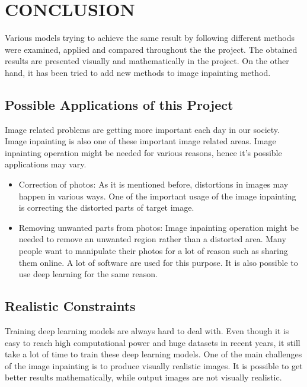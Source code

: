 \chapter{CONCLUSION}\label{conclution}

Various models trying to achieve the same result by following different methods were examined, applied and compared throughout the the project. The obtained results are presented visually and mathematically in the project. On the other hand, it has been tried to add new methods to image inpainting method.

\section{Possible Applications of this Project}

Image related problems are getting more important each day in our society. Image inpainting is also one of these important image related areas. Image inpainting operation might be needed for various reasons, hence it's possible applications may vary.

\begin{itemize}
  \item Correction of photos: As it is mentioned before, distortions in images may happen in various ways. One of the important usage of the image inpainting is correcting the distorted parts of target image. 
  \item Removing unwanted parts from photos: Image inpainting operation might be needed to remove an unwanted region rather than a distorted area. Many people want to manipulate their photos for a lot of reason such as sharing them online. A lot of software are used for this purpose. It is also possible to use deep learning for the same reason.
\end{itemize}

\section{Realistic Constraints}

Training deep learning models are always hard to deal with. Even though it is easy to reach high computational power and huge datasets in recent years, it still take a lot of time to train these deep learning models. One of the main challenges of the image inpainting is to produce visually realistic images. It is possible to get better results mathematically, while output images are not visually realistic.

